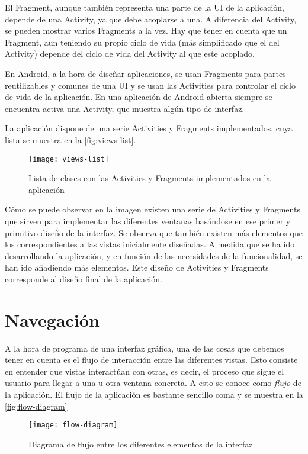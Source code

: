 El Fragment, aunque también representa una parte de la UI de la aplicación, depende de una Activity, ya que debe acoplarse a una. A diferencia del Activity, se pueden mostrar varios Fragments a la vez. Hay que tener en cuenta que un Fragment, aun teniendo su propio ciclo de vida (más simplificado que el del Activity) depende del ciclo de vida del Activity al que este acoplado. 

En Android, a la hora de diseñar aplicaciones, se usan Fragments para partes reutilizables y comunes de una UI y se usan las Activities para controlar el ciclo de vida de la aplicación. En una aplicación de Android abierta siempre se encuentra activa una Activity, que muestra algún tipo de interfaz.

La aplicación dispone de una serie Activities y Fragments implementados, cuya lista se muestra en la \autoref{fig:views-list}.

\begin{figure}[t]
	\centering
	\texttt{[image: views-list]}
	\caption{Lista de clases con las Activities y Fragments implementados en la aplicación}
	\label{fig:views-list}
\end{figure}

Cómo se puede observar en la imagen existen una serie de Activities y Fragments que sirven para implementar las diferentes ventanas basándose en ese primer y primitivo diseño de la interfaz. Se observa que también existen más elementos que los correspondientes a las vistas inicialmente diseñadas. A medida que se ha ido desarrollando la aplicación, y en función de las necesidades de la funcionalidad, se han ido añadiendo más elementos. Este diseño de Activities y Fragments corresponde al diseño final de la aplicación.

\section{Navegación}

A la hora de programa de una interfaz gráfica, una de las cosas que debemos tener en cuenta es el flujo de interacción entre las diferentes vistas. Esto consiste en entender que vistas interactúan con otras, es decir, el proceso que sigue el usuario para llegar a una u otra ventana concreta. A esto se conoce como \textit{flujo} de la aplicación. El flujo de la aplicación es bastante sencillo coma y se muestra en la \autoref{fig:flow-diagram}

\begin{figure}[H]
	\centering
	\texttt{[image: flow-diagram]}
	\caption{Diagrama de flujo entre los diferentes elementos de la interfaz}
	\label{fig:flow-diagram}
\end{figure}

